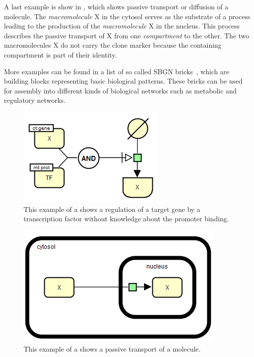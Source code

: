 A last example is show in , which shows passive transport or diffusion of a molecule. The \emph{macromolecule} X in the cytosol serves as the substrate of a process leading to the production of the \emph{macromolecule} X in the nucleus. This process describes the passive transport of X from one \emph{compartment} to the other. The two macromolecules X do not carry the clone marker because the containing compartment is part of their identity.

More examples can be found in a list of so called SBGN bricks~\cite{Junker:2012}, which are building blocks representing basic biological patterns. These bricks can be used for assembly into different kinds of biological networks such as metabolic and regulatory networks.

\begin{figure}[h]
  \centering
  \vspace*{-0.75em}
  \includegraphics[scale=0.5]{images/Fig14}
  \caption{This example of a \PD shows a regulation of a target gene by a transcription factor without knowledge about the promoter binding.}
  \label{fig:eg4}
\end{figure}


\begin{figure}[h]
  \centering
  \vspace*{-0.75em}
  \includegraphics[scale=0.5]{images/Fig15}
  \caption{This example of a \PD shows a passive transport of a molecule.}
  \label{fig:eg5}
\end{figure}

